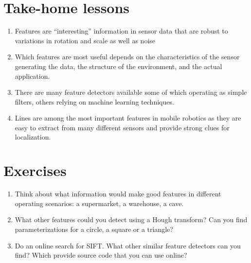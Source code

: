 \section*{Take-home lessons}
\begin{enumerate}
\item Features are ``interesting'' information in sensor data that are robust to variations in rotation and scale as well as noise
\item Which features are most useful depends on the characteristics of the sensor generating the data, the structure of the environment, and the actual application.
\item There are many feature detectors available some of which operating as simple filters, others relying on machine learning techniques.
\item Lines are among the most important features in mobile robotics as they are easy to extract from many different sensors and provide strong clues for localization.
\end{enumerate}

\section*{Exercises}\small
\begin{enumerate}
\item Think about what information would make good features in different operating scenarios: a supermarket, a warehouse, a cave. 
\item What other features could you detect using a Hough transform? Can you find parameterizations for a circle, a square or a triangle?
\item Do an online search for SIFT. What other similar feature detectors can you find? Which provide source code that you can use online?
\end{enumerate}
\normalsize